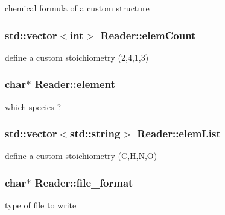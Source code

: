 chemical formula of a custom structure 

\hypertarget{class_reader_a81393d6441793db4fd62c7a4652518d3}{}
\subsubsection[{elem\+Count}]{\setlength{\rightskip}{0pt plus 5cm}std\+::vector$<$int$>$ Reader\+::elem\+Count}\label{class_reader_a81393d6441793db4fd62c7a4652518d3}


define a custom stoichiometry (2,4,1,3) 

\hypertarget{class_reader_aad797cfb4296c19561d2729de8cd9333}{}
\subsubsection[{element}]{\setlength{\rightskip}{0pt plus 5cm}char$\ast$ Reader\+::element}\label{class_reader_aad797cfb4296c19561d2729de8cd9333}


which species ? 

\hypertarget{class_reader_a81df051804ba55004944e2d6f9a43cf7}{}
\subsubsection[{elem\+List}]{\setlength{\rightskip}{0pt plus 5cm}std\+::vector$<$std\+::string$>$ Reader\+::elem\+List}\label{class_reader_a81df051804ba55004944e2d6f9a43cf7}


define a custom stoichiometry (C,H,N,O) 

\hypertarget{class_reader_a8031979223c6835ee2a52be58c13f9b1}{}
\subsubsection[{file\+\_\+format}]{\setlength{\rightskip}{0pt plus 5cm}char$\ast$ Reader\+::file\+\_\+format}\label{class_reader_a8031979223c6835ee2a52be58c13f9b1}


type of file to write 

\hypertarget{class_reader_a913c9024181fd0fbb2dea5265fa097c1}{}
